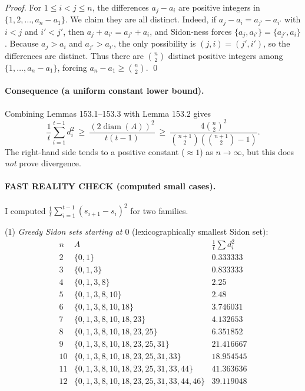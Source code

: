 \textit{Proof.}
For $1\le i<j\le n$, the differences $a_j-a_i$ are positive integers in $\{1,2,\dots, a_n-a_1\}$. We claim they are all distinct.
Indeed, if $a_j-a_i=a_{j'}-a_{i'}$ with $i<j$ and $i'<j'$, then
$a_j+a_{i'}=a_{j'}+a_i$, and Sidon-ness forces $\{a_j,a_{i'}\}=\{a_{j'},a_i\}$.
Because $a_j>a_i$ and $a_{j'}>a_{i'}$, the only possibility is $(j,i)=(j',i')$, so the differences are distinct.
Thus there are $\binom{n}{2}$ distinct positive integers among $\{1,\dots,a_n-a_1\}$, forcing $a_n-a_1\ge \binom{n}{2}$. \qed

\paragraph{Consequence (a uniform constant lower bound).}
Combining Lemmas 153.1--153.3 with Lemma 153.2 gives
\[
\frac{1}{t}\sum_{i=1}^{t-1} d_i^2\ \ge\ \frac{(2\operatorname{diam}(A))^2}{t(t-1)}
\ \ge\ \frac{4\binom{n}{2}^2}{\binom{n+1}{2}(\binom{n+1}{2}-1)}.
\]
The right-hand side tends to a positive constant ($\approx 1$) as $n\to\infty$, but this does \emph{not} prove divergence.

\paragraph{FAST REALITY CHECK (computed small cases).}
I computed $\frac{1}{t}\sum_{i=1}^{t-1} (s_{i+1}-s_i)^2$ for two families.

(1) \emph{Greedy Sidon sets starting at $0$} (lexicographically smallest Sidon set):
\[
\begin{array}{c|l|c}
 n & A & \frac{1}{t}\sum d_i^2 \\\hline
 2 & \{0,1\} & 0.333333\\
 3 & \{0,1,3\} & 0.833333\\
 4 & \{0,1,3,8\} & 2.25\\
 5 & \{0,1,3,8,10\} & 2.48\\
 6 & \{0,1,3,8,10,18\} & 3.746031\\
 7 & \{0,1,3,8,10,18,23\} & 4.132653\\
 8 & \{0,1,3,8,10,18,23,25\} & 6.351852\\
 9 & \{0,1,3,8,10,18,23,25,31\} & 21.416667\\
 10& \{0,1,3,8,10,18,23,25,31,33\} & 18.954545\\
 11& \{0,1,3,8,10,18,23,25,31,33,44\} & 41.363636\\
 12& \{0,1,3,8,10,18,23,25,31,33,44,46\} & 39.119048
\end{array}
\]

